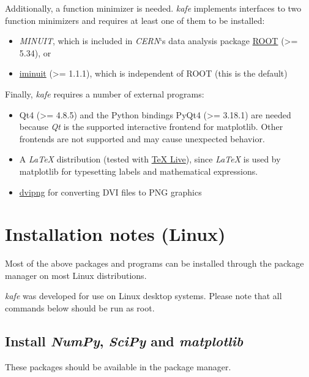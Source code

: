 \documentclass[a4paper,10pt,english]{sphinxmanual}
\begin{document}
Additionally, a function minimizer is needed. \emph{kafe} implements interfaces to two
function minimizers and requires at least one of them to be installed:
\begin{itemize}
\item {} 
\emph{MINUIT}, which is included in \emph{CERN}`s data analysis package \href{http://root.cern.ch}{ROOT} (\textgreater{}= 5.34), or

\item {} 
\href{https://github.com/iminuit/iminuit}{iminuit} (\textgreater{}= 1.1.1), which is independent of ROOT (this is the default)

\end{itemize}

Finally, \emph{kafe} requires a number of external programs:
\begin{itemize}
\item {} 
Qt4 (\textgreater{}= 4.8.5) and the Python bindings PyQt4 (\textgreater{}= 3.18.1) are needed because \emph{Qt} is the supported
interactive frontend for matplotlib. Other frontends are not supported and may cause unexpected behavior.

\item {} 
A \emph{LaTeX} distribution (tested with \href{https://www.tug.org/texlive/}{TeX Live}), since \emph{LaTeX} is
used by matplotlib for typesetting labels and mathematical expressions.

\item {} 
\href{http://www.nongnu.org/dvipng/}{dvipng} for converting DVI files to PNG graphics

\end{itemize}


\section{Installation notes (Linux)}
\label{installation:installation-notes-linux}
Most of the above packages and programs can be installed through the package manager on most Linux
distributions.

\emph{kafe} was developed for use on Linux desktop systems. Please note that all
commands below should be run as root.


\subsection{Install \emph{NumPy}, \emph{SciPy} and \emph{matplotlib}}
\label{installation:install-numpy-scipy-and-matplotlib}
These packages should be available in the package manager.
\end{document}
